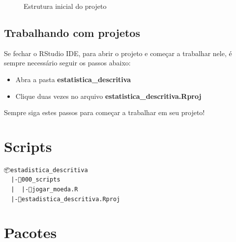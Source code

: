 \documentclass[
  letterpaper,
]{book}
\providecommand{\tightlist}{%
  \setlength{\itemsep}{0pt}\setlength{\parskip}{0pt}}\usepackage{longtable,booktabs,array}
\theoremstyle{definition}
\theoremstyle{plain}
\theoremstyle{remark}
\begin{document}
\begin{figure}


\caption{\label{fig-initial-project-structure}Estrutura inicial do
projeto}

\end{figure}%

\subsection{Trabalhando com projetos}\label{trabalhando-com-projetos}

Se fechar o RStudio IDE, para abrir o projeto e começar a trabalhar
nele, é sempre necessário seguir os passos abaixo:

\begin{itemize}
\tightlist
\item
  Abra a pasta \textbf{estatistica\_descritiva}
\item
  Clique duas vezes no arquivo \textbf{estatistica\_descritiva.Rproj}
\end{itemize}

Sempre siga estes passos para começar a trabalhar em seu projeto!

\section{Scripts}\label{scripts}

\begin{verbatim}
📦estadistica_descritiva
  |-📂000_scripts
  |  |-📜jogar_moeda.R
  |-📜estadistica_descritiva.Rproj
\end{verbatim}

\section{Pacotes}\label{pacotes}
\end{document}
